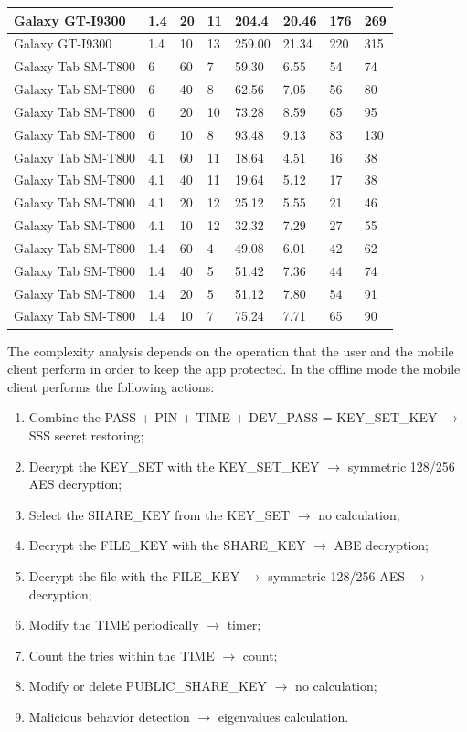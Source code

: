 \documentclass[twocolumn]{svjour3}          	%
\begin{document}
\begin{table}
\begin{tabular}{|l|l|l|l|l|l|l|l|}
		Galaxy GT-I9300	& 1.4	& 20	& 11	& 204.4	& 20.46	& 176	& 269	\\ \hline
		Galaxy GT-I9300	& 1.4	& 10	& 13	& 259.00	& 21.34	& 220	& 315	\\ \hline
		Galaxy Tab SM-T800	& 6	& 60	& 7	& 59.30	& 6.55	& 54	& 74	\\ \hline
		Galaxy Tab SM-T800	& 6	& 40	& 8	& 62.56	& 7.05	& 56	& 80	\\ \hline
		Galaxy Tab SM-T800	& 6	& 20	& 10	& 73.28	& 8.59	& 65	& 95	\\ \hline
		Galaxy Tab SM-T800	& 6	& 10	& 8	& 93.48	& 9.13	& 83	& 130	\\ \hline
		Galaxy Tab SM-T800	& 4.1	& 60	& 11	& 18.64	& 4.51	& 16	& 38	\\ \hline
		Galaxy Tab SM-T800	& 4.1	& 40	& 11	& 19.64	& 5.12	& 17	& 38	\\ \hline
		Galaxy Tab SM-T800	& 4.1	& 20	& 12	& 25.12	& 5.55	& 21	& 46	\\ \hline
		Galaxy Tab SM-T800	& 4.1	& 10	& 12	& 32.32	& 7.29	& 27	& 55	\\ \hline
		Galaxy Tab SM-T800	& 1.4	& 60	& 4	& 49.08	& 6.01	& 42	& 62	\\ \hline
		Galaxy Tab SM-T800	& 1.4	& 40	& 5	& 51.42	& 7.36	& 44	& 74	\\ \hline
		Galaxy Tab SM-T800	& 1.4	& 20	& 5	& 51.12	& 7.80	& 54	& 91	\\ \hline
		Galaxy Tab SM-T800	& 1.4	& 10	& 7	& 75.24	& 7.71	& 65	& 90	\\ \hline
	\end{tabular}
\end{table}

The complexity analysis depends on the operation that the user and the mobile client perform in order to keep the app protected. In the offline mode the mobile client performs the following actions:

\begin{enumerate}
	\item Combine the PASS + PIN + TIME + DEV\_PASS = KEY\_SET\_KEY $\rightarrow$ SSS secret restoring;
	\item Decrypt the KEY\_SET with the KEY\_SET\_KEY $\rightarrow$ symmetric 128/256 AES decryption;
	\item Select the SHARE\_KEY from the KEY\_SET $\rightarrow$ no calculation;
	\item Decrypt the FILE\_KEY with the SHARE\_KEY $\rightarrow$ ABE decryption;
	\item Decrypt the file with the FILE\_KEY $\rightarrow$ symmetric 128/256 AES $\rightarrow$ decryption;
	\item Modify the TIME periodically $\rightarrow$ timer;
	\item Count the tries within the TIME $\rightarrow$ count;
	\item Modify or delete PUBLIC\_SHARE\_KEY $\rightarrow$ no calculation;
	\item Malicious behavior detection $\rightarrow$ eigenvalues calculation.
\end{enumerate}
\end{document}
